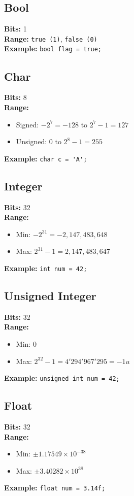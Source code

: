 \subsection{Bool}
\textbf{Bits:} 1 \\
\textbf{Range:} \lstinline[style=CodeExpert]{true (1)}, \lstinline[style=CodeExpert]{false (0)} \\
\textbf{Example:} \lstinline[style=CodeExpert]{bool flag = true;}

\subsection{Char}
\textbf{Bits:} 8 \\
\textbf{Range:} 
\begin{itemize}
    \item Signed: \( -2^7 = -128 \) to \( 2^7 - 1 = 127 \)
    \item Unsigned: \( 0 \) to \( 2^8 - 1 = 255 \)
\end{itemize}
\textbf{Example:} \lstinline[style=CodeExpert]{char c = 'A';}

\subsection{Integer}
\textbf{Bits:} 32 \\
\textbf{Range:} 
\begin{itemize}
    \item Min: \( -2^{31} = -2,147,483,648 \)
    \item Max: \( 2^{31} - 1 = 2,147,483,647 \)
\end{itemize}
\textbf{Example:} \lstinline[style=CodeExpert]{int num = 42;}

\subsection{Unsigned Integer}
\textbf{Bits:} 32 \\
\textbf{Range:} 
\begin{itemize}
    \item Min: \( 0 \)
    \item Max: \( 2^{32} - 1 = 4'294'967'295 = -1u\)
\end{itemize}
\textbf{Example:} \lstinline[style=CodeExpert]{unsigned int num = 42;}

\subsection{Float}
\textbf{Bits:} 32 \\
\textbf{Range:} 
\begin{itemize}
    \item Min: \( \pm 1.17549 \times 10^{-38} \)
    \item Max: \( \pm 3.40282 \times 10^{38} \)
\end{itemize}
\textbf{Example:} \lstinline[style=CodeExpert]{float num = 3.14f;}
